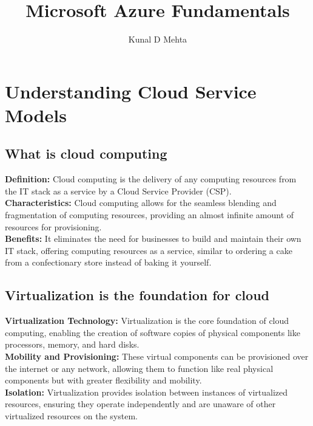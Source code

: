 \documentclass[12pt]{article}
\begin{document}

\title{\textbf{Microsoft Azure Fundamentals}}
\author{Kunal D Mehta}
\maketitle

\newpage
\tableofcontents
\newpage

\newpage
\section{Understanding Cloud Service Models}

\subsection{What is cloud computing}
\textbf{Definition:}  Cloud computing is the delivery of any computing resources from the IT stack as a service by a Cloud Service Provider (CSP).\\
\textbf{Characteristics:}  Cloud computing allows for the seamless blending and fragmentation of computing resources, providing an almost infinite amount of resources for provisioning.\\
\textbf{Benefits:}  It eliminates the need for businesses to build and maintain their own IT stack, offering computing resources as a service, similar to ordering a cake from a confectionary store instead of baking it yourself.

\subsection{Virtualization is the foundation for cloud}
\textbf{Virtualization Technology:}  Virtualization is the core foundation of cloud computing, enabling the creation of software copies of physical components like processors, memory, and hard disks.\\
\textbf{Mobility and Provisioning:}  These virtual components can be provisioned over the internet or any network, allowing them to function like real physical components but with greater flexibility and mobility.\\
\textbf{Isolation:}  Virtualization provides isolation between instances of virtualized resources, ensuring they operate independently and are unaware of other virtualized resources on the system.
\end{document}

